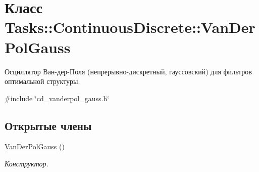 \hypertarget{class_tasks_1_1_continuous_discrete_1_1_van_der_pol_gauss}{}\section{Класс Tasks\+:\+:Continuous\+Discrete\+:\+:Van\+Der\+Pol\+Gauss}
\label{class_tasks_1_1_continuous_discrete_1_1_van_der_pol_gauss}


Осциллятор Ван-\/дер-\/Поля (непрерывно-\/дискретный, гауссовский) для фильтров оптимальной структуры.  




{\ttfamily \#include \char`\"{}cd\+\_\+vanderpol\+\_\+gauss.\+h\char`\"{}}

\subsection*{Открытые члены}
\begin{DoxyCompactItemize}
\item 
\hypertarget{class_tasks_1_1_continuous_discrete_1_1_van_der_pol_gauss_aef78157117996a736918e7dcd9ebbdd5}{}\label{class_tasks_1_1_continuous_discrete_1_1_van_der_pol_gauss_aef78157117996a736918e7dcd9ebbdd5} 
\hyperlink{class_tasks_1_1_continuous_discrete_1_1_van_der_pol_gauss_aef78157117996a736918e7dcd9ebbdd5}{Van\+Der\+Pol\+Gauss} ()
\begin{DoxyCompactList}\small\item\em Конструктор. \end{DoxyCompactList}\end{DoxyCompactItemize}
